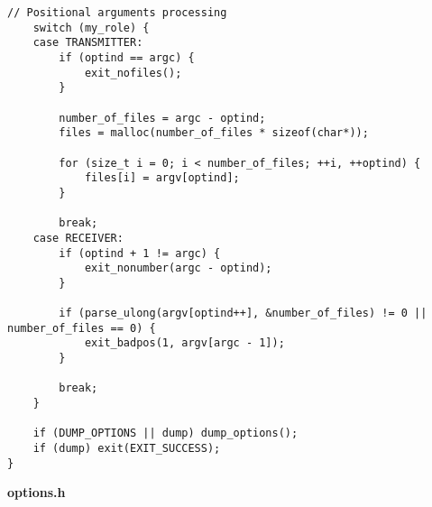 \documentclass[subfiles]{main.tex}
\begin{document}
\begin{lstlisting}[style=rcom]
	// Positional arguments processing
	switch (my_role) {
	case TRANSMITTER:
		if (optind == argc) {
			exit_nofiles();
		}
		
		number_of_files = argc - optind;
		files = malloc(number_of_files * sizeof(char*));
		
		for (size_t i = 0; i < number_of_files; ++i, ++optind) {
			files[i] = argv[optind];
		}
		
		break;
	case RECEIVER:
		if (optind + 1 != argc) {
			exit_nonumber(argc - optind);
		}
		
		if (parse_ulong(argv[optind++], &number_of_files) != 0 || number_of_files == 0) {
			exit_badpos(1, argv[argc - 1]);
		}
		
		break;
	}
	
	if (DUMP_OPTIONS || dump) dump_options();
	if (dump) exit(EXIT_SUCCESS);
}
\end{lstlisting}

{\Large\textbf{options.h}}
\end{document}
